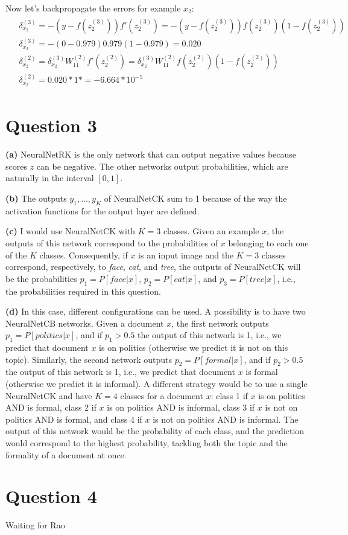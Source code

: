 \documentclass[leqno]{article}
\begin{document}
Now let's backpropagate the errors for example $x_2$:
\begin{gather*}
\begin{split}
&\delta_{x_2}^{(3)} = -(y - f(z_2^{(3)}))f'(z_2^{(3)}) = -(y - f(z_2^{(3)}))f(z_2^{(3)})(1 - f(z_2^{(3)}))\\
&\delta_{x_2}^{(3)} = -(0 - 0.979)0.979(1 - 0.979) = 0.020\\
&\delta_{x_2}^{(2)} = \delta_{x_2}^{(3)}W_{11}^{(2)}f'(z_2^{(2)}) = \delta_{x_2}^{(3)}W_{11}^{(2)}f(z_2^{(2)})(1 - f(z_2^{(2)}))\\
&\delta_{x_2}^{(2)} = 0.020*1* = -6.664*10^{-5}
\end{split}
\end{gather*}


\hfill
\section*{Question 3} \textbf{(a)} NeuralNetRK is the only network that can output negative values because scores $z$ can be negative. The other 
networks output probabilities, which are naturally in the interval $[0,1]$.

\hfill

\noindent \textbf{(b)} The outputs $y_1, \ldots, y_K$ of NeuralNetCK sum to 1 because of the way the activation functions for the output layer are defined. 

\hfill

\noindent \textbf{(c)} I would use NeuralNetCK with $K = 3$ classes. Given an example $x$, the outputs of this network correspond to the probabilities of $x$ belonging to 
 each one of the $K$ classes. Consequently, if $x$ is an input image and the $K = 3$ classes correspond, respectively, to \textit{face}, \textit{cat}, and \textit{tree}, the 
outputs of NeuralNetCK will be the probabilities $p_1 = P[face|x]$, $p_2 = P[cat|x]$, and $p_3 = P[tree|x]$, i.e., the probabilities required in this question. 

\hfill

\noindent \textbf{(d)} In this case, different configurations can be used. A possibility is to have two NeuralNetCB networks. Given a document $x$, the first 
network outputs $p_1 = P[politics|x]$, and if $p_1 > 0.5$ the output of this network is 1, i.e., we predict that document $x$ is on politics (otherwise we predict it is not 
on this topic). Similarly, the 
second network outputs $p_2 = P[formal|x]$, and if $p_2 > 0.5$ the output of this network is 1, i.e., we predict that document $x$ is formal (otherwise we predict it is 
informal). A different strategy would be to use a single NeuralNetCK and have $K = 4$ classes for a document $x$: class 1 if $x$ is on politics AND is formal, 
class 2 if $x$ is on politics AND is informal, class 3 if $x$ is not on politics AND is formal, and class 4 if $x$ is not on politics AND is informal. The output of this 
network would be the probability of each class, and the prediction would correspond to the highest probability, tackling both the topic and the formality of a document at 
once. 

\hfill

\section*{Question 4} Waiting for Rao
\end{document}

